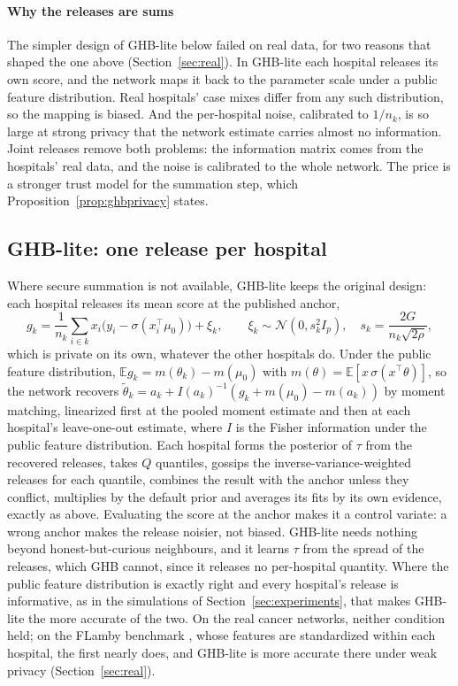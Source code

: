 \documentclass[acmsmall,screen,review]{acmart}
\theoremstyle{acmdefinition}
\begin{document}
\paragraph{Why the releases are sums} The simpler design of GHB-lite below failed on real data, for two reasons that shaped the one above (Section~\ref{sec:real}). In GHB-lite each hospital releases its own score, and the network maps it back to the parameter scale under a public feature distribution. Real hospitals' case mixes differ from any such distribution, so the mapping is biased. And the per-hospital noise, calibrated to $1/n_k$, is so large at strong privacy that the network estimate carries almost no information. Joint releases remove both problems: the information matrix comes from the hospitals' real data, and the noise is calibrated to the whole network. The price is a stronger trust model for the summation step, which Proposition~\ref{prop:ghbprivacy} states.

\subsection{GHB-lite: one release per hospital}\label{sec:lite}

Where secure summation is not available, GHB-lite keeps the original design: each hospital releases its mean score at the published anchor,
\[
g_k=\frac{1}{n_k}\sum_{i\in k}x_i\bigl(y_i-\sigma(x_i^{\top}\mu_0)\bigr)+\xi_k,\qquad \xi_k\sim\mathcal{N}(0,s_k^2I_p),\quad s_k=\frac{2G}{n_k\sqrt{2\rho}},
\]
which is private on its own, whatever the other hospitals do. Under the public feature distribution, $\mathbb{E}g_k=m(\theta_k)-m(\mu_0)$ with $m(\theta)=\mathbb{E}[x\,\sigma(x^{\top}\theta)]$, so the network recovers $\tilde{\theta}_k=a_k+I(a_k)^{-1}(g_k+m(\mu_0)-m(a_k))$ by moment matching, linearized first at the pooled moment estimate and then at each hospital's leave-one-out estimate, where $I$ is the Fisher information under the public feature distribution. Each hospital forms the posterior of $\tau$ from the recovered releases, takes $Q$ quantiles, gossips the inverse-variance-weighted releases for each quantile, combines the result with the anchor unless they conflict, multiplies by the default prior and averages its fits by its own evidence, exactly as above. Evaluating the score at the anchor makes it a control variate: a wrong anchor makes the release noisier, not biased. GHB-lite needs nothing beyond honest-but-curious neighbours, and it learns $\tau$ from the spread of the releases, which GHB cannot, since it releases no per-hospital quantity. Where the public feature distribution is exactly right and every hospital's release is informative, as in the simulations of Section~\ref{sec:experiments}, that makes GHB-lite the more accurate of the two. On the real cancer networks, neither condition held; on the FLamby benchmark \cite{ogierduterrail2022flamby}, whose features are standardized within each hospital, the first nearly does, and GHB-lite is more accurate there under weak privacy (Section~\ref{sec:real}).
\end{document}

